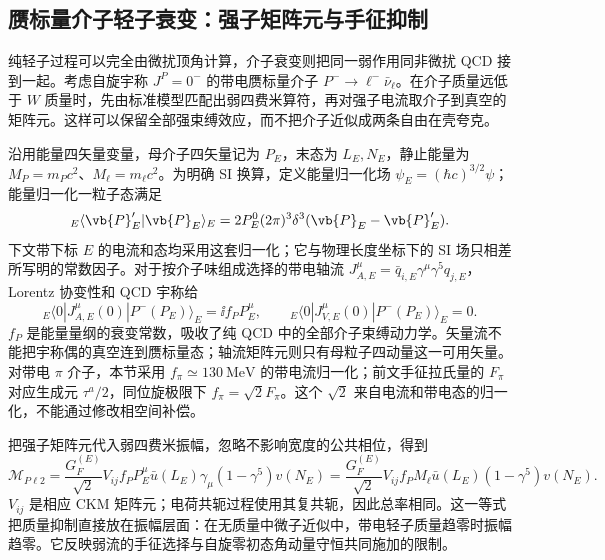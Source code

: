 \subsection{赝标量介子轻子衰变：强子矩阵元与手征抑制}
\label{sec:sm-pseudoscalar-decay-applications}

纯轻子过程可以完全由微扰顶角计算，介子衰变则把同一弱作用同非微扰 QCD 接到一起。考虑自旋宇称 $J^P=0^-$ 的带电赝标量介子 $P^-\to\ell^-\bar\nu_\ell$。在介子质量远低于 $W$ 质量时，先由标准模型匹配出弱四费米算符，再对强子电流取介子到真空的矩阵元。这样可以保留全部强束缚效应，而不把介子近似成两条自由在壳夸克。

沿用能量四矢量变量，母介子四矢量记为 $P_E$，末态为 $L_E,N_E$，静止能量为 $M_P=m_Pc^2$、$M_\ell=m_\ell c^2$。为明确 SI 换算，定义能量归一化场 $\psi_E=(\hbar c)^{3/2}\psi$；能量归一化一粒子态满足
\begin{equation*}
 {}_E\langle\vb{P}'_E|\vb{P}_E\rangle_E
 =2P_E^0(2\pi)^3\delta^3(\vb{P}_E-\vb{P}'_E).
\end{equation*}
下文带下标 $E$ 的电流和态均采用这套归一化；它与物理长度坐标下的 SI 场只相差所写明的常数因子。对于按介子味组成选择的带电轴流 $J_{A,E}^\mu=\bar q_{i,E}\gamma^\mu\gamma^5q_{j,E}$，Lorentz 协变性和 QCD 宇称给
\begin{equation}
 {}_E\langle0|J_{A,E}^\mu(0)|P^-(P_E)\rangle_E
 =\ii f_P P_E^\mu,\qquad
 {}_E\langle0|J_{V,E}^\mu(0)|P^-(P_E)\rangle_E=0.
 \label{eq:sm-pseudoscalar-axial-definition}
\end{equation}
$f_P$ 是能量量纲的衰变常数，吸收了纯 QCD 中的全部介子束缚动力学。矢量流不能把宇称偶的真空连到赝标量态；轴流矩阵元则只有母粒子四动量这一可用矢量。对带电 $\pi$ 介子，本节采用 $f_\pi\simeq\SI{130}{\mega\electronvolt}$ 的带电流归一化；前文手征拉氏量的 $F_\pi$ 对应生成元 $\tau^a/2$，同位旋极限下 $f_\pi=\sqrt2F_\pi$。这个 $\sqrt2$ 来自电流和带电态的归一化，不能通过修改相空间补偿\cite{Briere2024Pseudoscalar}。

把强子矩阵元代入弱四费米振幅，忽略不影响宽度的公共相位，得到
\begin{equation}
 \mathcal M_{P\ell2}
 =\frac{G_F^{(E)}}{\sqrt2}V_{ij}f_P
 P_E^\mu\bar u(L_E)\gamma_\mu(1-\gamma^5)v(N_E)
 =\frac{G_F^{(E)}}{\sqrt2}V_{ij}f_PM_\ell
 \bar u(L_E)(1-\gamma^5)v(N_E).
 \label{eq:sm-pseudoscalar-amplitude}
\end{equation}
$V_{ij}$ 是相应 CKM 矩阵元；电荷共轭过程使用其复共轭，因此总率相同。这一等式把质量抑制直接放在振幅层面：在无质量中微子近似中，带电轻子质量趋零时振幅趋零。它反映弱流的手征选择与自旋零初态角动量守恒共同施加的限制。

